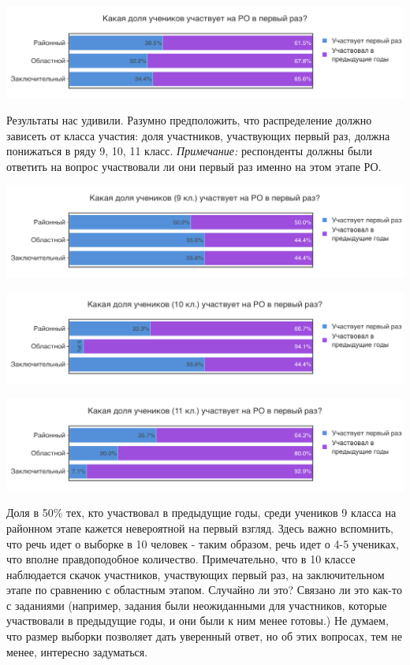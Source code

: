 \includegraphics[width=\linewidth]{../export/pdf/demographics/firsttimers.pdf}

Результаты нас удивили. Разумно предположить, что распределение должно зависеть от класса участия: доля участников, участвующих первый раз, должна понижаться в ряду 9, 10, 11 класс. \textit{Примечание:} респонденты должны были ответить на вопрос участвовали ли они первый раз именно на этом этапе РО.

\includegraphics[width=\linewidth]{../export/pdf/demographics/firsttimers-grade9.pdf}

\includegraphics[width=\linewidth]{../export/pdf/demographics/firsttimers-grade10.pdf}

\includegraphics[width=\linewidth]{../export/pdf/demographics/firsttimers-grade11.pdf}

Доля в 50\% тех, кто участвовал в предыдущие годы, среди учеников 9 класса на районном этапе кажется невероятной на первый взгляд. Здесь важно вспомнить, что речь идет о выборке в 10 человек - таким образом, речь идет о 4-5 учениках, что вполне правдоподобное количество. Примечательно, что в 10 классе наблюдается скачок участников, участвующих первый раз, на заключительном этапе по сравнению с областным этапом. Случайно ли это? Связано ли это как-то с заданиями (например, задания были неожиданными для участников, которые участвовали в предыдущие годы, и они были к ним менее готовы.) Не думаем, что размер выборки позволяет дать уверенный ответ, но об этих вопросах, тем не менее, интересно задуматься. 

